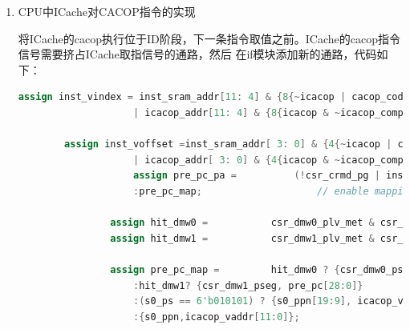 \documentclass[11pt]{article}
\begin{document}
\begin{enumerate}
    其中，reg_tagv_dcacop是用来寄存即将写入dacache中tagv的寄存器
    \begin{lstlisting}[language=verilog]
        reg [20:0] reg_tagv_dcacop;
        always @(posedge clk) begin
            if (!resetn) begin
            reg_tagv_dcacop <= 20'b0;
            end
            else if (~(|reg_tagv_dcacop) & cacop & code[4:3] == 2'b01) begin
                reg_tagv_dcacop <= offset[0] ?  {way1_tag,way1_v} : {way0_tag,way0_v};
            end
            else if (~(|reg_tagv_dcacop) & cacop & code[4:3] == 2'b10 & way0_hit) begin
                reg_tagv_dcacop <= {way0_tag,way0_v};
            end
            else if (~(|reg_tagv_dcacop) & cacop & code[4:3] == 2'b10 & way1_hit) begin
                reg_tagv_dcacop <= {way1_tag,way1_v};
            end
            else if((|reg_tagv_dcacop) & ~cacop) begin
                reg_tagv_dcacop <= 20'b0;
            end 
        end
    \end{lstlisting}
    \item CPU中ICache对CACOP指令的实现
    
    将ICache的cacop执行位于ID阶段，下一条指令取值之前。ICache的cacop指令信号需要挤占ICache取指信号的通路，然后
    在if模块添加新的通路，代码如下：
    \begin{lstlisting}[language=verilog]
        assign inst_vindex = inst_sram_addr[11: 4] & {8{~icacop | cacop_code[4:3]==2'b10 | icacop_complete}}
                    | icacop_addr[11: 4] & {8{icacop & ~icacop_complete & cacop_code[4:3]!=2'b10}};

        assign inst_voffset =inst_sram_addr[ 3: 0] & {4{~icacop | cacop_code[4:3]==2'b10 | icacop_complete}}
                    | icacop_addr[ 3: 0] & {4{icacop & ~icacop_complete & cacop_code[4:3]!=2'b10}};
                    assign pre_pc_pa =          (!csr_crmd_pg | inst_cacop & cacop_code[4:3] == 2'b00 | inst_cacop & cacop_code[4:3] == 2'b01) ? pre_pc            // direct translate
                    :pre_pc_map;                    // enable mapping
                
                assign hit_dmw0 =           csr_dmw0_plv_met & csr_dmw0_vseg == pre_pc[31:29];
                assign hit_dmw1 =           csr_dmw1_plv_met & csr_dmw1_vseg == pre_pc[31:29];

                assign pre_pc_map =         hit_dmw0 ? {csr_dmw0_pseg, pre_pc[28:0]}         // dierct map windows 0
                    :hit_dmw1? {csr_dmw1_pseg, pre_pc[28:0]}         // direct map windows 1
                    :(s0_ps == 6'b010101) ? {s0_ppn[19:9], icacop_vaddr[20:0]}   // tlb map: ps 4Mb
                    :{s0_ppn,icacop_vaddr[11:0]};                             // tlb map : ps 4kb


\end{lstlisting}
\end{enumerate}
\end{document}
